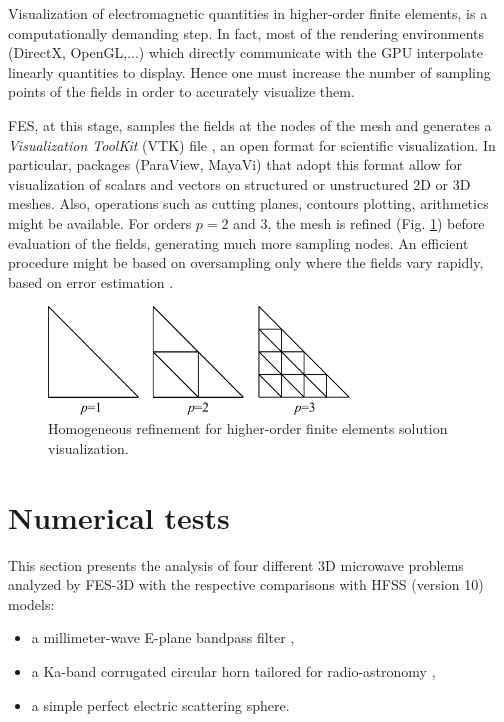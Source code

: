Visualization of electromagnetic quantities in higher-order finite elements, is a computationally demanding step. In fact, most of the rendering environments (DirectX, OpenGL,...) which directly communicate with the GPU interpolate linearly quantities to display. Hence one must increase the number of sampling points of the fields in order to accurately visualize them. 

FES, at this stage, samples the fields at the nodes of the mesh and generates a \textit{Visualization ToolKit} (VTK) file \cite{VTK4}, an open format for scientific visualization. In particular, packages (ParaView, MayaVi) that adopt this format allow for visualization of scalars and vectors on structured or unstructured 2D or 3D meshes. Also, operations such as cutting planes, contours plotting, arithmetics might be available. For orders $p=2$ and $3$, the mesh is refined (Fig. \ref{fig:Refinement}) before evaluation of the fields, generating much more sampling nodes. An efficient procedure might be based on oversampling only where the fields vary rapidly, based on error estimation \cite{remacle2007efficient}. 

\begin{figure}[ht!]
\centering
\includegraphics[width=8cm]{Refinement}
\caption{Homogeneous refinement for higher-order finite elements solution visualization.}
\label{fig:Refinement}
\end{figure}

\section{Numerical tests}

This section presents the analysis of four different 3D microwave problems analyzed by FES-3D with the respective comparisons with HFSS (version 10) models:
\begin{itemize}
\item a millimeter-wave E-plane bandpass filter \cite{bui1984broad},
\item a Ka-band corrugated circular horn tailored for radio-astronomy \cite{lucci2005corrugated}, 
\item a simple perfect electric scattering sphere.
\end{itemize}

